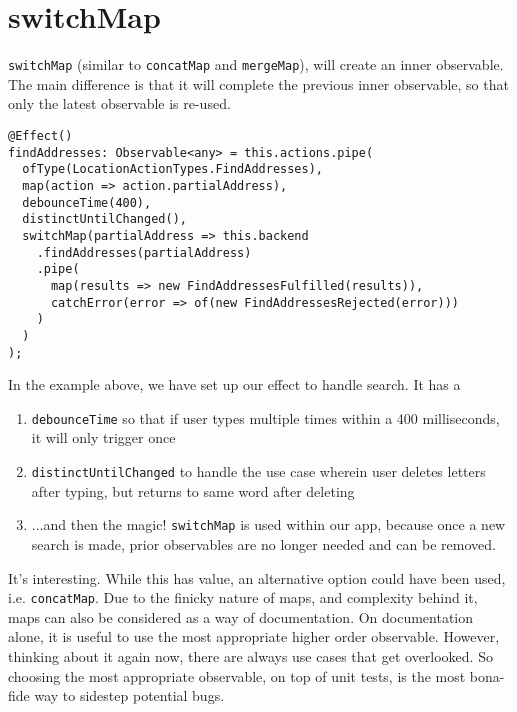 \section{switchMap}
\lstinline{switchMap} (similar to \lstinline{concatMap} and \lstinline{mergeMap}),
will create an inner observable. The main difference is that it will complete 
the previous inner observable, so that only the latest observable is re-used. 

\begin{lstlisting}[caption=search-bar.component.ts]
@Effect()
findAddresses: Observable<any> = this.actions.pipe(
  ofType(LocationActionTypes.FindAddresses),
  map(action => action.partialAddress),
  debounceTime(400),
  distinctUntilChanged(),
  switchMap(partialAddress => this.backend
    .findAddresses(partialAddress)
    .pipe(
      map(results => new FindAddressesFulfilled(results)),
      catchError(error => of(new FindAddressesRejected(error)))
    )
  )
);  
\end{lstlisting}
 
In the example above, we have set up our effect to handle search. It has a 
\begin{enumerate}
  \item \lstinline{debounceTime} so that if user types multiple times within
  a 400 milliseconds, it will only trigger once
  \item \lstinline{distinctUntilChanged} to handle the use case wherein user 
  deletes letters after typing, but returns to same word after deleting
  \item ...and then the magic! \lstinline{switchMap} is used within our app,
  because once a new search is made, prior observables are no longer needed 
  and can be removed. 
\end{enumerate}

It's interesting. While this has value, an alternative option could have been used, i.e. \lstinline{concatMap}. Due to the finicky nature of maps, and complexity behind it, maps can also be considered as a way of documentation. On documentation alone, it is useful to use the most appropriate higher order observable. However, thinking about it again now, there are always use cases that get overlooked. So choosing the most appropriate observable, on top of unit tests, is the most bona-fide way to sidestep potential bugs.


